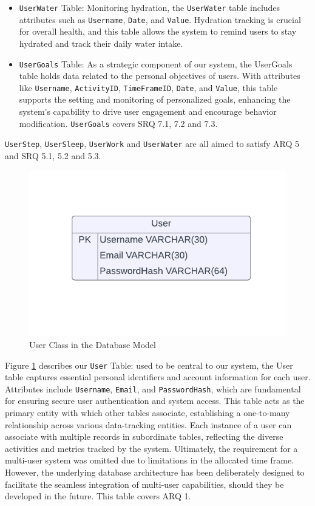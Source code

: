 \documentclass[12pt]{article}
\begin{document}
\begin{itemize}
    \item \texttt{UserWater} Table: Monitoring hydration, the \texttt{UserWater} table
        includes attributes such as \texttt{Username}, \texttt{Date}, and \texttt{Value}. Hydration
        tracking is crucial for overall health, and this table allows the
        system to remind users to stay hydrated and track their daily water
        intake.\par

    \item \texttt{UserGoals} Table: As a strategic component of our system, the
        UserGoals table holds data related to the personal objectives of users.
        With attributes like \texttt{Username}, \texttt{ActivityID}, \texttt{TimeFrameID}, \texttt{Date}, and
        \texttt{Value}, this table supports the setting and monitoring of personalized
        goals, enhancing the system's capability to drive user engagement and
        encourage behavior modification. \texttt{UserGoals} covers SRQ 7.1, 7.2 and
        7.3.\par

\end{itemize}

\texttt{UserStep}, \texttt{UserSleep}, \texttt{UserWork} and \texttt{UserWater}
are all aimed to satisfy ARQ 5 and SRQ 5.1, 5.2 and 5.3.

\begin{figure}[!ht]
  \centering
  \includegraphics[width = 0.4\linewidth]{PI Systems Database-2}
  \caption{User Class in the Database Model}
  \label{fig:User_Table}
\end{figure}

Figure \ref{fig:User_Table} describes our \texttt{User} Table: used to be
central to our system, the User table captures essential personal identifiers and
account information for each user. Attributes include \texttt{Username}, \texttt{Email}, and
\texttt{PasswordHash}, which are fundamental for ensuring secure user authentication and
system access. This table acts as the primary entity with which other tables
associate, establishing a one-to-many relationship across various data-tracking
entities. Each instance of a user can associate with multiple records in
subordinate tables, reflecting the diverse activities and metrics tracked by the
system. Ultimately, the requirement for a multi-user system was omitted due to
limitations in the allocated time frame. However, the underlying database
architecture has been deliberately designed to facilitate the seamless
integration of multi-user capabilities, should they be developed in the future.
This table covers ARQ 1.
\end{document}
